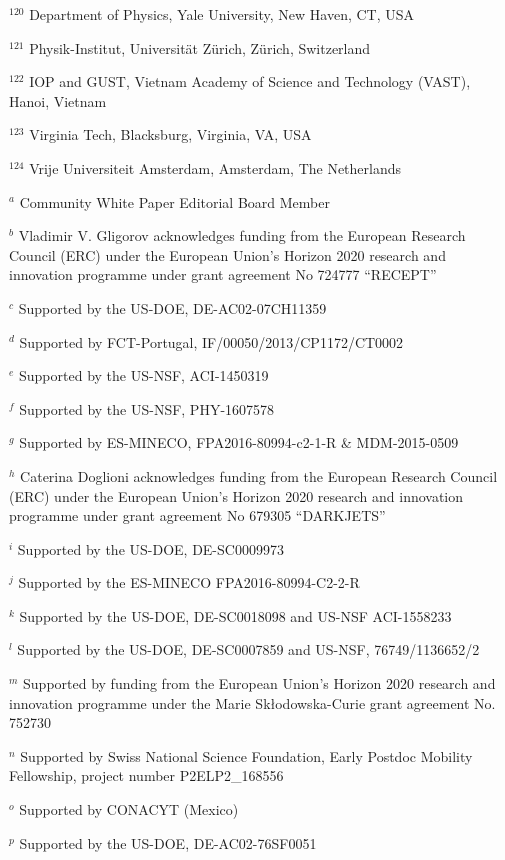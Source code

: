 \par {\footnotesize $^{120}$ Department of Physics, Yale University, New Haven, CT, USA}
\par {\footnotesize $^{121}$ Physik-Institut, Universität Zürich, Zürich, Switzerland}
\par {\footnotesize $^{122}$ IOP and GUST, Vietnam Academy of Science and Technology (VAST), Hanoi, Vietnam}
\par {\footnotesize $^{123}$ Virginia Tech, Blacksburg, Virginia, VA, USA}
\par {\footnotesize $^{124}$ Vrije Universiteit Amsterdam, Amsterdam, The Netherlands}
\bigskip
\par {\footnotesize $^{a}$ Community White Paper Editorial Board Member}
\par {\footnotesize $^{b}$ Vladimir V. Gligorov acknowledges funding from the European Research Council (ERC) under the European Union's Horizon 2020 research and innovation programme under grant agreement No 724777 “RECEPT”}
\par {\footnotesize $^{c}$ Supported by the US-DOE, DE-AC02-07CH11359}
\par {\footnotesize $^{d}$ Supported by FCT-Portugal, IF/00050/2013/CP1172/CT0002}
\par {\footnotesize $^{e}$ Supported by the US-NSF, ACI-1450319}
\par {\footnotesize $^{f}$ Supported by the US-NSF, PHY-1607578}
\par {\footnotesize $^{g}$ Supported by ES-MINECO, FPA2016-80994-c2-1-R \& MDM-2015-0509}
\par {\footnotesize $^{h}$ Caterina Doglioni acknowledges funding from the European Research Council (ERC) under the European Union's Horizon 2020 research and innovation programme under grant agreement No 679305 “DARKJETS”}
\par {\footnotesize $^{i}$ Supported by the US-DOE, DE-SC0009973}
\par {\footnotesize $^{j}$ Supported by the ES-MINECO FPA2016-80994-C2-2-R}
\par {\footnotesize $^{k}$ Supported by the US-DOE, DE-SC0018098 and US-NSF ACI-1558233}
\par {\footnotesize $^{l}$ Supported by the US-DOE, DE-SC0007859 and US-NSF, 76749/1136652/2}
\par {\footnotesize $^{m}$ Supported by funding from the European Union’s Horizon 2020 research and innovation programme under the Marie Skłodowska-Curie grant agreement No. 752730}
\par {\footnotesize $^{n}$ Supported by Swiss National Science Foundation, Early Postdoc Mobility Fellowship, project number P2ELP2\_168556}
\par {\footnotesize $^{o}$ Supported by CONACYT (Mexico)}
\par {\footnotesize $^{p}$ Supported by the US-DOE, DE-AC02-76SF0051}
